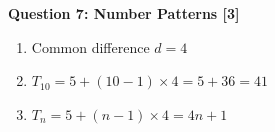 \documentclass[12pt,a4paper]{article}
\begin{document}
\textbf{Question 7: Number Patterns [3]}
\begin{enumerate}[label=(\alph*)]
    \item Common difference $d = 4$ \checkmark
    \vspace{0.3cm}
    
    \item $T_{10} = 5 + (10-1) \times 4 = 5 + 36 = 41$ \checkmark
    \vspace{0.3cm}
    
    \item $T_n = 5 + (n-1) \times 4 = 4n + 1$ \checkmark
\end{enumerate}
\end{document}

